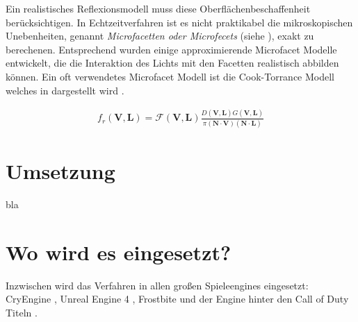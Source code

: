 
Ein realistisches Reflexionsmodell muss diese Oberflächenbeschaffenheit berücksichtigen. In Echtzeitverfahren ist es nicht praktikabel die mikroskopischen Unebenheiten, genannt \textit{Microfacetten oder Microfecets} (siehe ), exakt zu berechenen. Entsprechend wurden einige approximierende Microfacet Modelle entwickelt, die die Interaktion des Lichts mit den Facetten realistisch abbilden können. Ein oft verwendetes Microfacet Modell ist die Cook-Torrance Modell \parencite{Cook1981} welches in  dargestellt wird \parencite[Kapitel 6.9.2, Seite 194]{Lengyel2003}.

\begin{align}
	\label{eq:cook-torrance-model}
	f_r(\mathbf V,\mathbf L) = \mathcal{F}(\mathbf V,\mathbf L)\frac{D(\mathbf V,\mathbf L)G(\mathbf V,\mathbf L)}{\pi(\mathbf N \cdot \mathbf V)(\mathbf N \cdot \mathbf L)}
\end{align}

\section{Umsetzung}
\label{sec:pbr-umsetzung}

bla

\section{Wo wird es eingesetzt?}
\label{sec:pbr-wo}
Inzwischen wird das Verfahren in allen großen Spieleengines eingesetzt: CryEngine \parencite{Schulz2014}, Unreal Engine 4 \parencite{Martin2012}, Frostbite \parencite{Lagarde2014} und der Engine hinter den Call of Duty Titeln \parencite{Lazarov2011}.
